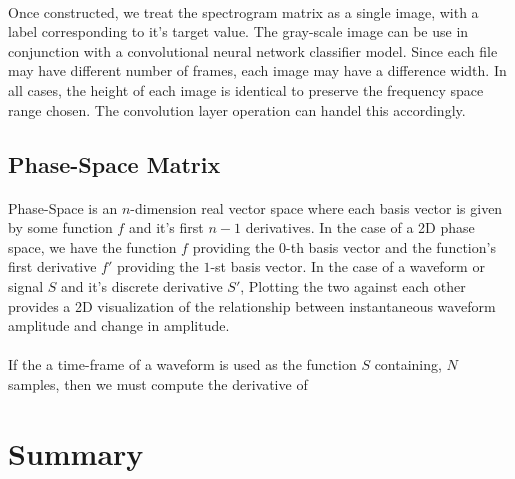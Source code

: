 \documentclass[12pt,letterpaper]{article}
\begin{document}
\paragraph*{}Once constructed, we treat the spectrogram matrix as a single image, with a label corresponding to it's target value. The gray-scale image can be use in conjunction with a convolutional neural network classifier model. Since each file may have different number of frames, each image may have a difference width. In all cases, the height of each image is identical to preserve the frequency space range chosen. The convolution layer operation can handel this accordingly.


\subsection{Phase-Space Matrix}

\paragraph*{}Phase-Space is an $n$-dimension real vector space where each basis vector is given by some function $f$ and it's first $n-1$ derivatives. In the case of a 2D phase space, we have the function $f$ providing the $0$-th basis vector and the function's first derivative $f'$ providing the $1$-st basis vector. In the case of a waveform or signal $S$ and it's discrete derivative $S'$, Plotting the two against each other provides a 2D visualization of the relationship between instantaneous waveform amplitude and change in amplitude.

\paragraph*{}If the a time-frame of a waveform is used as the function $S$ containing, $N$ samples, then we must compute the derivative of 




\section*{Summary}

\end{document}
